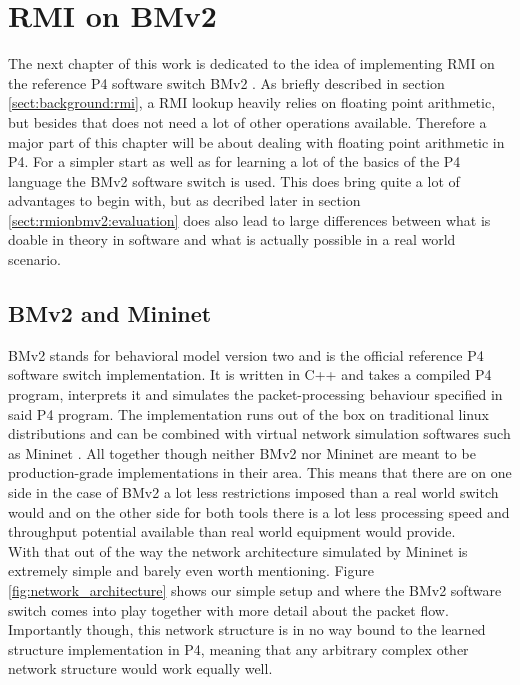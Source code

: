 
\chapter{RMI on BMv2}
\label{ch:rmionbmv2}
The next chapter of this work is dedicated to the idea of implementing RMI on the reference P4 software switch BMv2 \cite{bmv2}. As briefly described in section \ref{sect:background:rmi}, a RMI lookup heavily relies on floating point arithmetic, but besides that does not need a lot of other operations available. Therefore a major part of this chapter will be about dealing with floating point arithmetic in P4. For a simpler start as well as for learning a lot of the basics of the P4 language the BMv2 software switch is used. This does bring quite a lot of advantages to begin with, but as decribed later in section \ref{sect:rmionbmv2:evaluation} does also lead to large differences between what is doable in theory in software and what is actually possible in a real world scenario.

\section{BMv2 and Mininet}
BMv2 \cite{bmv2} stands for behavioral model version two and is the official reference P4 software switch implementation. It is written in C++ and takes a compiled P4 program,  interprets it and simulates the packet-processing behaviour specified in said P4 program. The implementation runs out of the box on traditional linux distributions and can be combined with virtual network simulation softwares such as Mininet \cite{mininet}. All together though neither BMv2 nor Mininet are meant to be production-grade implementations in their area. This means that there are on one side in the case of BMv2 a lot less restrictions imposed than a real world switch would and on the other side for both tools there is a lot less processing speed and throughput potential available than real world equipment would provide.\\

With that out of the way the network architecture simulated by Mininet is extremely simple and barely even worth mentioning. Figure \ref{fig:network_architecture} shows our simple setup and where the BMv2 software switch comes into play together with more detail about the packet flow. Importantly though, this network structure is in no way bound to the learned structure implementation in P4, meaning that any arbitrary complex other network structure would work equally well.

